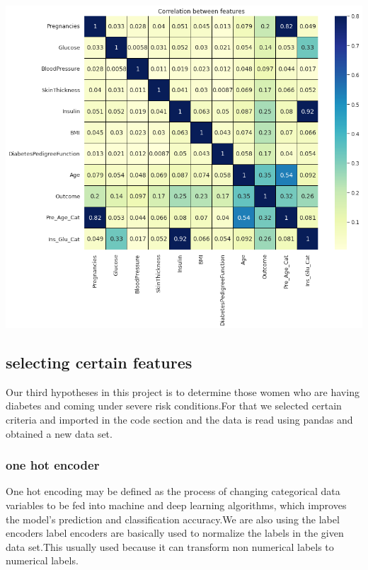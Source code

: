 \documentclass[journal,twoside,web]{ieeecolor}
\begin{document}
\includegraphics[scale=0.2]{correlation.png}

\subsection{selecting certain features}
Our third hypotheses in this project is to determine those women who are having diabetes and coming under severe risk conditions.For that we selected certain criteria  and imported in the code section and the data is read using pandas and obtained a new data set.
\subsubsection{one hot encoder}
One hot encoding may be defined as the process of changing categorical data variables to be fed into machine and deep learning algorithms,\cite{Alakh Sethi} which improves the model's prediction and classification accuracy.We are also using the label encoders label encoders are basically used to normalize the labels in the given data set.This usually used because it can transform non numerical labels to numerical labels.
\end{document}
